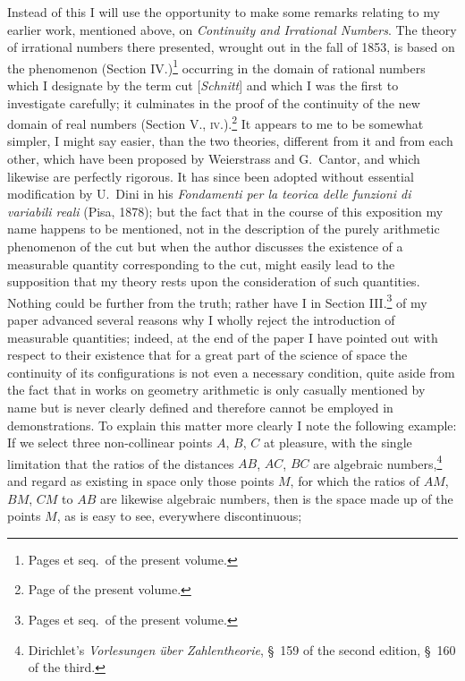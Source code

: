 \documentclass[oneside]{book}
\begin{document}
Instead of this I will use the opportunity to make
some remarks relating to my earlier work, mentioned
above, on \textit{Continuity and Irrational Numbers}. The
theory of irrational numbers there presented, wrought
out in the fall of 1853, is based on the phenomenon
(Section IV.)\footnote{Pages \pageref{EISIV} et seq.\ of the present volume.} occurring in the domain of rational
numbers which I designate by the term cut [\textit{Schnitt}]
and which I was the first to investigate carefully; it
culminates in the proof of the continuity of the new
domain of real numbers (Section V., \textsc{iv}.).\footnote{Page \pageref{EISViv} of the present volume.} It appears
to me to be somewhat simpler, I might say easier,
than the two theories, different from it and from each
other, which have been proposed by Weierstrass and
G.~Cantor, and which likewise are perfectly rigorous.
It has since been adopted without essential modification
by U.~Dini in his \textit{Fondamenti per la teorica delle
funzioni di variabili reali} (Pisa, 1878); but the fact that
in the course of this exposition my name happens to
be mentioned, not in the description of the purely
arithmetic phenomenon of the cut but when the author
discusses the existence of a measurable quantity
corresponding to the cut, might easily lead to the supposition
that my theory rests upon the consideration
of such quantities. Nothing could be further from
the truth; rather have I in Section III.\footnote{Pages \pageref{EISIII} et seq.\ of the present volume.} of my paper
advanced several reasons why I wholly reject the introduction
of measurable quantities; indeed, at the
end of the paper I have pointed out with respect to
their existence that for a great part of the science of
space the continuity of its configurations is not even
a necessary condition, quite aside from the fact that
in works on geometry arithmetic is only casually mentioned
by name but is never clearly defined and therefore
cannot be employed in demonstrations. To explain
this matter more clearly I note the following
example: If we select three non-collinear points $A$,
$B$, $C$ at pleasure, with the single limitation that the
ratios of the distances $AB$, $AC$, $BC$ are algebraic
numbers,\footnote{Dirichlet's \textit{Vorlesungen über Zahlentheorie}, §~159 of the second edition,
§~160 of the third.} and regard as existing in space only those
points $M$, for which the ratios of $AM$, $BM$, $CM$ to $AB$
are likewise algebraic numbers, then is the space made
up of the points $M$, as is easy to see, everywhere discontinuous;
\end{document}
